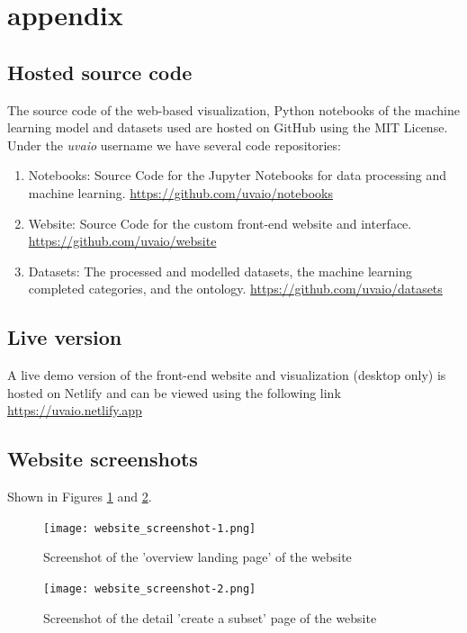 \section{appendix}

\subsection{Hosted source code}

The source code of the web-based visualization, Python notebooks of the machine learning model and datasets used are hosted on GitHub using the MIT License. Under the \textit{uvaio} username we have several code repositories:

\begin{enumerate}
  \item Notebooks: Source Code for the Jupyter Notebooks for data processing and machine learning. \underline{https://github.com/uvaio/notebooks}
  \item Website: Source Code for the custom front-end website and interface. \underline{https://github.com/uvaio/website}
  \item Datasets: The processed and modelled datasets, the machine learning completed categories, and the ontology. \underline{https://github.com/uvaio/datasets}
\end{enumerate}

\subsection{Live version}
A live demo version of the front-end website and visualization (desktop only) is hosted on Netlify and can be viewed using the following link \underline{https://uvaio.netlify.app}


\subsection{Website screenshots}

Shown in Figures \ref{fig:summary} and \ref{fig:subset}.


 \begin{figure}[!]
    \centering
    \texttt{[image: website\_screenshot-1.png]}
    \caption{Screenshot of the 'overview landing page' of the  website}
    \label{fig:summary}
\end{figure}

 \begin{figure}[!]
    \centering
    \texttt{[image: website\_screenshot-2.png]}
    \caption{Screenshot of the detail 'create a subset' page of the website}
    \label{fig:subset}
\end{figure}

